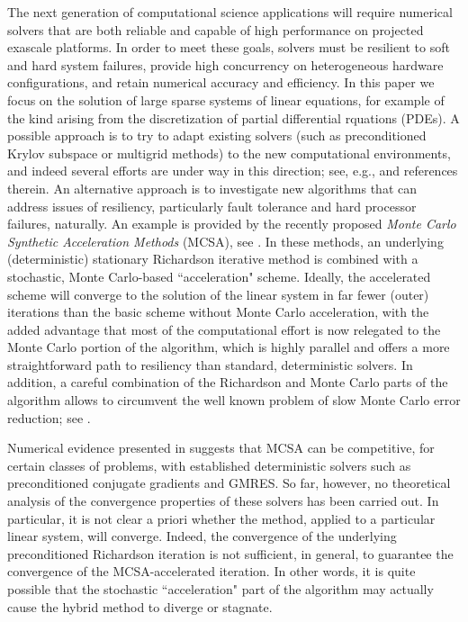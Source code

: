 \documentclass[final,leqno,onefignum,onetabnum]{siamltex1213}
\begin{document}
The next generation of computational science applications will require numerical
solvers that are both reliable and capable of high performance on projected exascale
platforms. In order to meet these goals, solvers must be resilient to soft and hard 
system failures, provide high concurrency on heterogeneous hardware configurations,
and retain numerical accuracy and efficiency. In this paper we focus on the
solution of large sparse systems of linear equations, for
example of the kind arising from the discretization of partial differential
rquations (PDEs).  A possible approach is to try to adapt existing solvers
(such as preconditioned Krylov subspace or multigrid methods) to the new
computational environments, and indeed several efforts are under way in this
direction; see, e.g., \cite{Agullo,FLRU15,Heroux,Rizzi,Stoyanov} and references therein. 
An alternative approach is to investigate
new algorithms that can address issues of resiliency, particularly fault
tolerance and hard processor failures, naturally. An example is provided
by the recently proposed {\em Monte Carlo Synthetic Acceleration Methods}
(MCSA), see \cite{EMSH2014,Slattery2013}. 
In these methods, an underlying (deterministic) stationary Richardson iterative
method is combined with a stochastic, Monte Carlo-based ``acceleration" scheme.
Ideally, the accelerated scheme will converge to the solution of the linear
system in far fewer (outer) iterations than the basic scheme without Monte Carlo
acceleration, with the added advantage that most of the computational effort
is now relegated to the Monte Carlo portion of the algorithm, which is 
highly parallel and offers a more straightforward path to resiliency
than standard, deterministic solvers. In addition,
a careful combination of the Richardson
and Monte Carlo parts of the algorithm allows to circumvent the well known
problem of slow Monte Carlo error reduction; see \cite{EMSH2014}.

Numerical evidence presented in \cite{EMSH2014} suggests
that MCSA can be competitive, for certain classes of problems,
with established deterministic solvers such as preconditioned 
conjugate gradients and GMRES. So far, however, no theoretical analysis
of the convergence properties of these solvers has been carried out. In
particular, it is not clear a priori whether the method, applied to a
particular linear system, will converge. 
Indeed, the convergence of the underlying preconditioned Richardson
iteration is not sufficient, in general, to guarantee the convergence
of the MCSA-accelerated iteration. In other words, it is quite possible
that the stochastic ``acceleration" part of the algorithm may actually
cause the hybrid method to diverge or stagnate.
\end{document}
